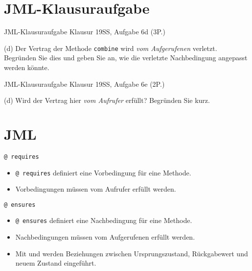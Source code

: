 \documentclass{beamer}
\begin{document}
\section{JML-Klausuraufgabe}

\begin{frame}{JML-Klausuraufgabe}
    Klausur 19SS, Aufgabe 6d (3P.)

    {
    \footnotesize

    (d) Der Vertrag der Methode \texttt{combine} wird \emph{vom Aufgerufenen} verletzt.
    Begründen Sie dies und geben Sie an, wie die verletzte Nachbedingung angepasst werden könnte.
    }
\end{frame}

\begin{frame}{JML-Klausuraufgabe}
    Klausur 19SS, Aufgabe 6e (2P.)

    {
    \footnotesize

    (d) Wird der Vertrag hier \emph{vom Aufrufer} erfüllt?
    Begründen Sie kurz.
    }
\end{frame}

\section{JML}

\begin{frame}{\texttt{@ requires}}

	\begin{itemize}
		\item \texttt{@ requires} definiert eine Vorbedingung für eine Methode.
		\item Vorbedingungen müssen vom Aufrufer erfüllt werden.
	\end{itemize}
\end{frame}

\begin{frame}{\texttt{@ ensures}}

	\begin{itemize}
		\item \texttt{@ ensures} definiert eine Nachbedingung für eine Methode.
		\item Nachbedingungen müssen vom Aufgerufenen erfüllt werden.
        \item Mit \texttt{\string\old} und \texttt{\string\result} werden Beziehungen zwischen Ursprungszustand, Rückgabewert und neuem Zustand eingeführt.
	\end{itemize}
\end{frame}
\end{document}
